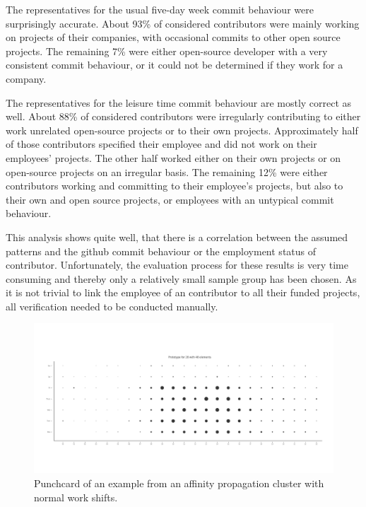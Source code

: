 The representatives for the usual five-day week commit behaviour were surprisingly accurate.
About 93\% of considered contributors were mainly working on projects of their companies, with occasional commits to other open source projects.
The remaining 7\% were either open-source developer with a very consistent commit behaviour, or it could not be determined if they work for a company.

The representatives for the leisure time commit behaviour are mostly correct as well.
About 88\% of considered contributors were irregularly contributing to either work unrelated open-source projects or to their own projects.
Approximately half of those contributors specified their employee and did not work on their employees' projects.
The other half worked either on their own projects or on open-source projects on an irregular basis.
The remaining 12\% were either contributors working and committing to their employee's projects, but also to their own and open source projects, or employees with an untypical commit behaviour.

This analysis shows quite well, that there is a correlation between the assumed patterns and the github commit behaviour or the employment status of contributor.
Unfortunately, the evaluation process for these results is very time consuming and thereby only a relatively small sample group has been chosen.
As it is not trivial to link the employee of an contributor to all their funded projects, all verification needed to be conducted manually.

\begin{figure}[H]
    \includegraphics[scale=0.32]{./graphs/analysis-affinity/28}
    \centering
    \caption{Punchcard of an example from an affinity propagation cluster with normal work shifts.}\label{fig:random-sleep-rhythm}
\end{figure}


